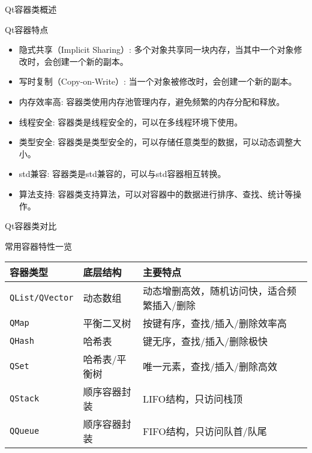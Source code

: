 \documentclass[UTF8,aspectratio=169]{beamer}
\begin{document}
\begin{frame}{Qt容器类概述}
    \begin{ytublock}{Qt容器特点}
        \begin{itemize}
            \item 隐式共享（Implicit Sharing）: 多个对象共享同一块内存，当其中一个对象修改时，会创建一个新的副本。
            \item 写时复制（Copy-on-Write）: 当一个对象被修改时，会创建一个新的副本。
            \item 内存效率高: 容器类使用内存池管理内存，避免频繁的内存分配和释放。
            \item 线程安全: 容器类是线程安全的，可以在多线程环境下使用。
            \item 类型安全: 容器类是类型安全的，可以存储任意类型的数据，可以动态调整大小。
            \item std兼容: 容器类是std兼容的，可以与std容器相互转换。
            \item 算法支持: 容器类支持算法，可以对容器中的数据进行排序、查找、统计等操作。
        \end{itemize}
    \end{ytublock}
\end{frame}

\begin{frame}{Qt容器类对比}
    \begin{ytublock}{常用容器特性一览}
        \begin{table}[H]
            \centering
            \renewcommand{\arraystretch}{1.2}
            \begin{tabular}{|p{2.6cm}|p{2.5cm}|p{5.5cm}|}
                \hline
                \textbf{容器类型} & \textbf{底层结构} & \textbf{主要特点} \\
                \hline
                \texttt{QList/QVector} & 动态数组 & 动态增删高效，随机访问快，适合频繁插入/删除 \\
                \hline
                \texttt{QMap} & 平衡二叉树 & 按键有序，查找/插入/删除效率高 \\
                \hline
                \texttt{QHash} & 哈希表 & 键无序，查找/插入/删除极快 \\
                \hline
                \texttt{QSet} & 哈希表/平衡树 & 唯一元素，查找/插入/删除高效 \\
                \hline
                \texttt{QStack} & 顺序容器封装 & LIFO结构，只访问栈顶 \\
                \hline
                \texttt{QQueue} & 顺序容器封装 & FIFO结构，只访问队首/队尾 \\
                \hline
            \end{tabular}
        \end{table}
    \end{ytublock}
\end{frame}
\end{document}
